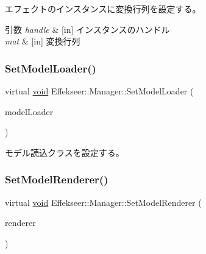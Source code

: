 エフェクトのインスタンスに変換行列を設定する。 


\begin{DoxyParams}{引数}
{\em handle} & \mbox{[}in\mbox{]} インスタンスのハンドル \\
\hline
{\em mat} & \mbox{[}in\mbox{]} 変換行列 \\
\hline
\end{DoxyParams}
\mbox{\label{class_effekseer_1_1_manager_a994104b9b353a09861d27ec87b09fa1c}} 
\subsubsection{\texorpdfstring{Set\+Model\+Loader()}{SetModelLoader()}}
{\footnotesize\ttfamily virtual \mbox{\hyperlink{namespace_effekseer_ab34c4088e512200cf4c2716f168deb56}{void}} Effekseer\+::\+Manager\+::\+Set\+Model\+Loader (\begin{DoxyParamCaption}\item[{\mbox{\hyperlink{class_effekseer_1_1_model_loader}{Model\+Loader}} $\ast$}]{model\+Loader }\end{DoxyParamCaption})\hspace{0.3cm}{\ttfamily [pure virtual]}}



モデル読込クラスを設定する。 

\mbox{\label{class_effekseer_1_1_manager_aa423ee424d0b713ac4939fc7faf39b9c}} 
\subsubsection{\texorpdfstring{Set\+Model\+Renderer()}{SetModelRenderer()}}
{\footnotesize\ttfamily virtual \mbox{\hyperlink{namespace_effekseer_ab34c4088e512200cf4c2716f168deb56}{void}} Effekseer\+::\+Manager\+::\+Set\+Model\+Renderer (\begin{DoxyParamCaption}\item[{\mbox{\hyperlink{class_effekseer_1_1_model_renderer}{Model\+Renderer}} $\ast$}]{renderer }\end{DoxyParamCaption})\hspace{0.3cm}{\ttfamily [pure virtual]}}



